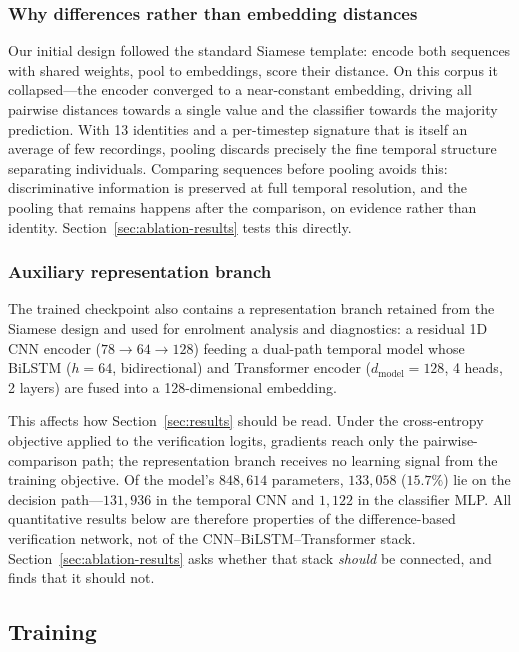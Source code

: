\documentclass[conference]{IEEEtran}
\begin{document}
\subsubsection{Why differences rather than embedding distances}
Our initial design followed the standard Siamese template: encode both
sequences with shared weights, pool to embeddings, score their distance. On
this corpus it collapsed---the encoder converged to a near-constant embedding,
driving all pairwise distances towards a single value and the classifier
towards the majority prediction. With 13 identities and a per-timestep
signature that is itself an average of few recordings, pooling discards
precisely the fine temporal structure separating individuals. Comparing
sequences before pooling avoids this: discriminative information is preserved
at full temporal resolution, and the pooling that remains happens after the
comparison, on evidence rather than identity.
Section~\ref{sec:ablation-results} tests this directly.

\subsubsection{Auxiliary representation branch}
\label{sec:aux}
The trained checkpoint also contains a representation branch retained from the
Siamese design and used for enrolment analysis and diagnostics: a residual 1D
CNN encoder ($78 \rightarrow 64 \rightarrow 128$) feeding a dual-path temporal
model whose BiLSTM ($h=64$, bidirectional) and Transformer encoder
($d_{\text{model}}=128$, 4 heads, 2 layers) are fused into a 128-dimensional
embedding.

This affects how Section~\ref{sec:results} should be read. Under the cross-entropy objective
applied to the verification logits, gradients reach only the pairwise-comparison
path; the representation branch receives no learning signal from the training
objective. Of the model's $848{,}614$ parameters, $133{,}058$ ($15.7\%$) lie on
the decision path---$131{,}936$ in the temporal CNN and $1{,}122$ in the
classifier MLP. All quantitative results below are therefore properties of the
difference-based verification network, not of the CNN--BiLSTM--Transformer
stack. Section~\ref{sec:ablation-results} asks whether that stack \emph{should}
be connected, and finds that it should not.

\subsection{Training}
\label{sec:training}
\end{document}
